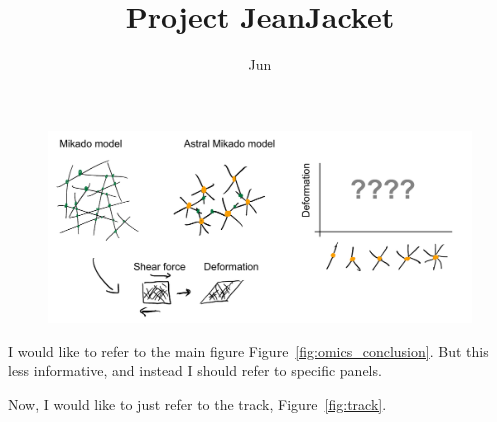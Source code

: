 \documentclass[onecolumn,11pt]{article}
\title{Project JeanJacket}
\author[a]{Jun}
\affil[a]{University of California Irvine}
\date{} %
\begin{document}
\maketitle









\clearpage


\begin{figure}[ht]
        \centering
        \includegraphics[width=4.5in]{figures/figJeanJacket.pdf}
        \begin{internalcaption}
        \end{internalcaption}
\end{figure}



I would like to refer to the main figure Figure~\ref{fig:omics_conclusion}. But this less informative, and instead I should refer to specific panels.

Now, I would like to just refer to the track, Figure~\ref{fig:track}.
\end{document}
